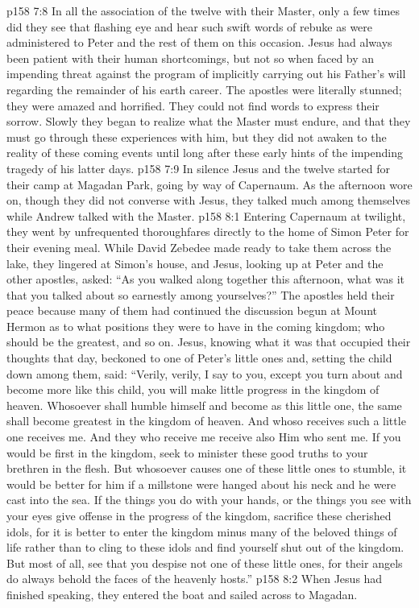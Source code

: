 \vs p158 7:8 In all the association of the twelve with their Master, only a few times did they see that flashing eye and hear such swift words of rebuke as were administered to Peter and the rest of them on this occasion. Jesus had always been patient with their human shortcomings, but not so when faced by an impending threat against the program of implicitly carrying out his Father’s will regarding the remainder of his earth career. The apostles were literally stunned; they were amazed and horrified. They could not find words to express their sorrow. Slowly they began to realize what the Master must endure, and that they must go through these experiences with him, but they did not awaken to the reality of these coming events until long after these early hints of the impending tragedy of his latter days.
\vs p158 7:9 In silence Jesus and the twelve started for their camp at Magadan Park, going by way of Capernaum. As the afternoon wore on, though they did not converse with Jesus, they talked much among themselves while Andrew talked with the Master.
\vs p158 8:1 Entering Capernaum at twilight, they went by unfrequented thoroughfares directly to the home of Simon Peter for their evening meal. While David Zebedee made ready to take them across the lake, they lingered at Simon’s house, and Jesus, looking up at Peter and the other apostles, asked: \textcolor{ubdarkred}{“As you walked along together this afternoon, what was it that you talked about so earnestly among yourselves?”} The apostles held their peace because many of them had continued the discussion begun at Mount Hermon as to what positions they were to have in the coming kingdom; who should be the greatest, and so on. Jesus, knowing what it was that occupied their thoughts that day, beckoned to one of Peter’s little ones and, setting the child down among them, said: \textcolor{ubdarkred}{“Verily, verily, I say to you, except you turn about and become more like this child, you will make little progress in the kingdom of heaven. Whosoever shall humble himself and become as this little one, the same shall become greatest in the kingdom of heaven. And whoso receives such a little one receives me. And they who receive me receive also Him who sent me. If you would be first in the kingdom, seek to minister these good truths to your brethren in the flesh. But whosoever causes one of these little ones to stumble, it would be better for him if a millstone were hanged about his neck and he were cast into the sea. If the things you do with your hands, or the things you see with your eyes give offense in the progress of the kingdom, sacrifice these cherished idols, for it is better to enter the kingdom minus many of the beloved things of life rather than to cling to these idols and find yourself shut out of the kingdom. But most of all, see that you despise not one of these little ones, for their angels do always behold the faces of the heavenly hosts.”}\plusone
\vs p158 8:2 When Jesus had finished speaking, they entered the boat and sailed across to Magadan.
